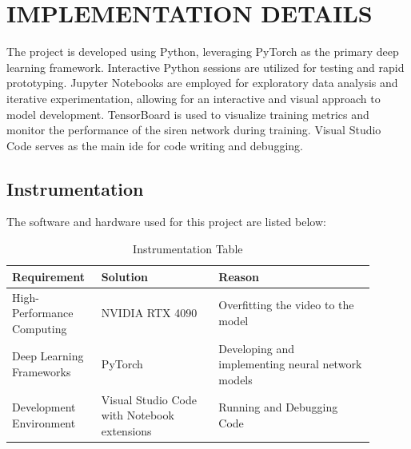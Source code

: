 \section{\MakeUppercase{Implementation Details}}
The project is developed using Python, leveraging PyTorch as the primary deep learning framework. Interactive Python sessions are utilized for testing and rapid prototyping. Jupyter Notebooks are employed for exploratory data analysis and iterative experimentation, allowing for an interactive and visual approach to model development. TensorBoard is used to visualize training metrics and monitor the performance of the \gls{siren} network during training. Visual Studio Code serves as the main \gls{ide} for code writing and debugging.

\subsection{Instrumentation}
    The software and hardware used for this project are listed below:
    \begin{table}[H]
        \caption{Instrumentation Table}
        \label{table:instrumentation-table}
        \centering
        \begin{tabular}{|L{0.2\linewidth}|L{0.3\linewidth}|L{0.4\linewidth}|}
            \hline
            \textbf{Requirement} & \textbf{Solution} & \textbf{Reason} \\
            \hline
            High-Performance Computing & NVIDIA RTX 4090 & Overfitting the video to the model \\
            \hline
            Deep Learning Frameworks & PyTorch &
            Developing and implementing neural network models \\
            \hline
            Development Environment & Visual Studio Code with Notebook extensions & Running and Debugging Code\\
            \hline
        \end{tabular}
    \end{table}
    


